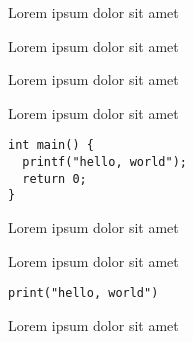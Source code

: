 \documentclass{ctexart}
\begin{document}
Lorem ipsum dolor sit amet

Lorem ipsum dolor sit amet

\medskip

Lorem ipsum dolor sit amet

Lorem ipsum dolor sit amet

\begin{verbatim}
int main() {
  printf("hello, world");
  return 0;
}
\end{verbatim}

Lorem ipsum dolor sit amet

Lorem ipsum dolor sit amet

\begin{verbatim}
print("hello, world")
\end{verbatim}

Lorem ipsum dolor sit amet
\end{document}
